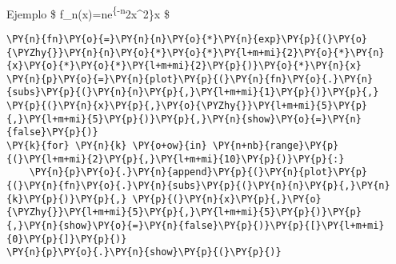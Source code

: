     \begin{center}
    \end{center}
    { \hspace*{\fill} \\}
    
    Ejemplo \$ f\_n(x)=ne\textsuperscript{\{-n}2x\^{}2\}x \$

    \begin{tcolorbox}[breakable, size=fbox, boxrule=1pt, pad at break*=1mm,colback=cellbackground, colframe=cellborder]
\begin{Verbatim}[commandchars=\\\{\}]
\PY{n}{fn}\PY{o}{=}\PY{n}{n}\PY{o}{*}\PY{n}{exp}\PY{p}{(}\PY{o}{\PYZhy{}}\PY{n}{n}\PY{o}{*}\PY{o}{*}\PY{l+m+mi}{2}\PY{o}{*}\PY{n}{x}\PY{o}{*}\PY{o}{*}\PY{l+m+mi}{2}\PY{p}{)}\PY{o}{*}\PY{n}{x}
\PY{n}{p}\PY{o}{=}\PY{n}{plot}\PY{p}{(}\PY{n}{fn}\PY{o}{.}\PY{n}{subs}\PY{p}{(}\PY{n}{n}\PY{p}{,}\PY{l+m+mi}{1}\PY{p}{)}\PY{p}{,} \PY{p}{(}\PY{n}{x}\PY{p}{,}\PY{o}{\PYZhy{}}\PY{l+m+mi}{5}\PY{p}{,}\PY{l+m+mi}{5}\PY{p}{)}\PY{p}{,}\PY{n}{show}\PY{o}{=}\PY{n}{false}\PY{p}{)}
\PY{k}{for} \PY{n}{k} \PY{o+ow}{in} \PY{n+nb}{range}\PY{p}{(}\PY{l+m+mi}{2}\PY{p}{,}\PY{l+m+mi}{10}\PY{p}{)}\PY{p}{:}
    \PY{n}{p}\PY{o}{.}\PY{n}{append}\PY{p}{(}\PY{n}{plot}\PY{p}{(}\PY{n}{fn}\PY{o}{.}\PY{n}{subs}\PY{p}{(}\PY{n}{n}\PY{p}{,}\PY{n}{k}\PY{p}{)}\PY{p}{,} \PY{p}{(}\PY{n}{x}\PY{p}{,}\PY{o}{\PYZhy{}}\PY{l+m+mi}{5}\PY{p}{,}\PY{l+m+mi}{5}\PY{p}{)}\PY{p}{,}\PY{n}{show}\PY{o}{=}\PY{n}{false}\PY{p}{)}\PY{p}{[}\PY{l+m+mi}{0}\PY{p}{]}\PY{p}{)}
\PY{n}{p}\PY{o}{.}\PY{n}{show}\PY{p}{(}\PY{p}{)}
\end{Verbatim}
\end{tcolorbox}

    \begin{center}
    \end{center}
    { \hspace*{\fill} \\}
    

    
